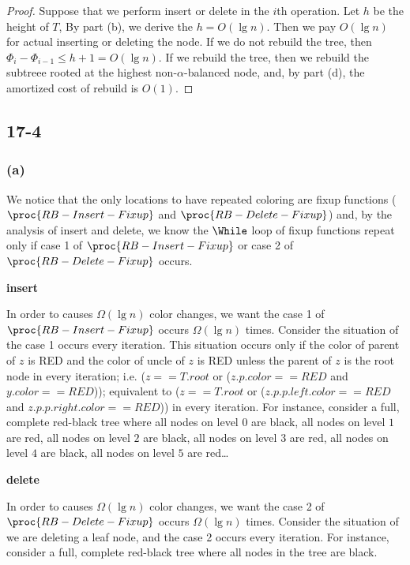 \begin{proof}
    Suppose that we perform insert or delete in the $i$th operation.
    Let $h$ be the height of $T$,
    By part (b), we derive the $h = O(\lg n)$.
    Then we pay $O(\lg n)$ for actual inserting or deleting the node.
    If we do not rebuild the tree, 
    then $\Phi_i - \Phi_{i-1} \leq h + 1 = O(\lg n)$.
    If we rebuild the tree,
    then we rebuild the subtreee rooted at the highest 
    non-$\alpha$-balanced node, and, by part (d), 
    the amortized cost of rebuild is $O(1)$.
\end{proof}

\subsection*{17-4}

\subsubsection*{(a)}

We notice that the only locations to have repeated coloring 
are fixup functions 
($\proc{RB-Insert-Fixup}$ and $\proc{RB-Delete-Fixup}$)
and, by the analysis of insert and delete,
we know the $\While$ loop of fixup functions repeat
only if case 1 of $\proc{RB-Insert-Fixup}$ or
case 2 of $\proc{RB-Delete-Fixup}$ occurs.

\textbf{insert}

In order to causes $\Omega(\lg n)$ color changes,
we want the case 1 of $\proc{RB-Insert-Fixup}$ 
occurs $\Omega(\lg n)$ times.
Consider the situation of the case 1 occurs every iteration.
This situation occurs only if
the color of parent of $z$ is RED
and the color of uncle of $z$ is RED
unless the parent of $z$ is the root node in every iteration;
i.e. ($z == T.root$ or ($z.p.color == RED$ and $y.color == RED$));
equivalent to ($z == T.root$ or 
($z.p.p.left.color == RED$ and $z.p.p.right.color == RED$))
in every iteration.
For instance, consider a full, complete red-black tree where 
all nodes on level $0$ are black,
all nodes on level $1$ are red, 
all nodes on level $2$ are black, 
all nodes on level $3$ are red, 
all nodes on level $4$ are black, 
all nodes on level $5$ are red\dots

\textbf{delete}

In order to causes $\Omega(\lg n)$ color changes,
we want the case 2 of $\proc{RB-Delete-Fixup}$ 
occurs $\Omega(\lg n)$ times.
Consider the situation of we are deleting a leaf node,
and the case 2 occurs every iteration.
For instance, consider a full, complete red-black tree where 
all nodes in the tree are black.

